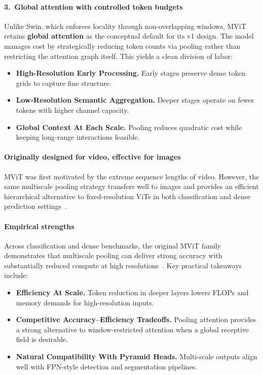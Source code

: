 \paragraph{3.\ Global attention with controlled token budgets}
\noindent
Unlike Swin, which enforces locality through non-overlapping windows, MViT retains \textbf{global attention} as the conceptual default for its v1 design.
The model manages cost by strategically reducing token counts via pooling rather than restricting the attention graph itself.
This yields a clean division of labor:
\begin{itemize}
	\item \textbf{High-Resolution Early Processing.} Early stages preserve dense token grids to capture fine structure. 
	\item \textbf{Low-Resolution Semantic Aggregation.} Deeper stages operate on fewer tokens with higher channel capacity. 
	\item \textbf{Global Context At Each Scale.} Pooling reduces quadratic cost while keeping long-range interactions feasible. 
\end{itemize}

\paragraph{Originally designed for video, effective for images}
\noindent
MViT was first motivated by the extreme sequence lengths of video.
However, the same multiscale pooling strategy transfers well to images and provides an efficient hierarchical alternative to fixed-resolution ViTs in both classification and dense prediction settings~\cite{fan2021_mvit}.

\paragraph{Empirical strengths}
\noindent
Across classification and dense benchmarks, the original MViT family demonstrates that multiscale pooling can deliver strong accuracy with substantially reduced compute at high resolutions~\cite{fan2021_mvit}.
Key practical takeaways include:
\begin{itemize}
	\item \textbf{Efficiency At Scale.} Token reduction in deeper layers lowers FLOPs and memory demands for high-resolution inputs. 
	\item \textbf{Competitive Accuracy--Efficiency Tradeoffs.} Pooling attention provides a strong alternative to window-restricted attention when a global receptive field is desirable. 
	\item \textbf{Natural Compatibility With Pyramid Heads.} Multi-scale outputs align well with FPN-style detection and segmentation pipelines. 
\end{itemize}

